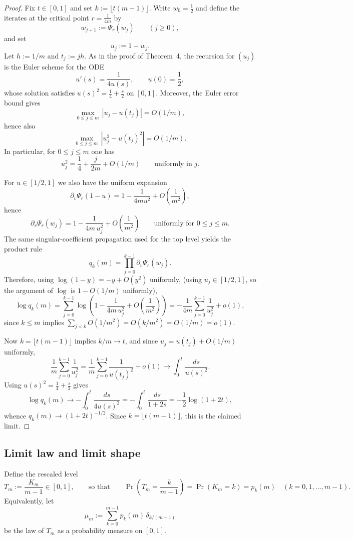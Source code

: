 \documentclass[11pt]{article}
\begin{document}
\begin{proof}
Fix $t\in[0,1]$ and set $k:=\lfloor t(m-1)\rfloor$.  Write $w_0=\frac12$ and define the
iterates at the critical point $r=\frac1{4m}$ by
\[
w_{j+1}:=\Psi_r(w_j)\qquad (j\ge0),
\]
and set
\[
u_j:=1-w_j.
\]
Let $h:=1/m$ and $t_j:=jh$.  As in the proof of Theorem~4, the recursion for $(u_j)$ is the
Euler scheme for the ODE
\[
u'(s)=\frac{1}{4u(s)},\qquad u(0)=\frac12,
\]
whose solution satisfies $u(s)^2=\frac14+\frac{s}{2}$ on $[0,1]$.  Moreover, the Euler error
bound gives
\[
\max_{0\le j\le m}\,|u_j-u(t_j)|=O(1/m),
\]
hence also
\[
\max_{0\le j\le m}\,|u_j^2-u(t_j)^2|=O(1/m).
\]
In particular, for $0\le j\le m$ one has
\[
u_j^2=\frac14+\frac{j}{2m}+O(1/m)
\qquad\text{uniformly in }j.
\]

For $u\in[1/2,1]$ we also have the uniform expansion
\[
\partial_v\Psi_r(1-u)=1-\frac{1}{4mu^2}+O\!\left(\frac1{m^2}\right),
\]
hence
\[
\partial_v\Psi_r(w_j)
=1-\frac{1}{4m\,u_j^2}+O\!\left(\frac1{m^2}\right)
\qquad\text{uniformly for }0\le j\le m.
\]
The same singular-coefficient propagation used for the top level yields the product rule
\[
q_k(m)=\prod_{j=0}^{k-1}\partial_v\Psi_r(w_j).
\]
Therefore, using $\log(1-y)=-y+O(y^2)$ uniformly, 
(using $u_j\in[1/2,1]$, so the argument of $\log$ is $1-O(1/m)$ uniformly),
\[
\log q_k(m)
=\sum_{j=0}^{k-1}\log\!\left(1-\frac{1}{4m\,u_j^2}+O\!\left(\frac1{m^2}\right)\right)
=-\frac{1}{4m}\sum_{j=0}^{k-1}\frac{1}{u_j^2}+o(1),
\]
since $k\le m$ implies $\sum_{j<k}O(1/m^2)=O(k/m^2)=O(1/m)=o(1)$.

Now $k=\lfloor t(m-1)\rfloor$ implies $k/m\to t$, and since $u_j=u(t_j)+O(1/m)$ uniformly,
\[
\frac1m\sum_{j=0}^{k-1}\frac{1}{u_j^2}
=\frac1m\sum_{j=0}^{k-1}\frac{1}{u(t_j)^2}+o(1)
\longrightarrow \int_0^t \frac{ds}{u(s)^2}.
\]
Using $u(s)^2=\frac14+\frac{s}{2}$ gives
\[
\log q_k(m)\longrightarrow
-\int_0^t \frac{ds}{4u(s)^2}
=-\int_0^t \frac{ds}{1+2s}
=-\frac12\log(1+2t),
\]
whence $q_k(m)\to (1+2t)^{-1/2}$.  Since $k=\lfloor t(m-1)\rfloor$, this is the claimed limit.
\end{proof}


\subsection{Limit law and limit shape}
Define the rescaled level
\[
T_m := \frac{K_m}{m-1}\in[0,1],
\qquad\text{so that}\qquad
\Pr\!\left(T_m=\frac{k}{m-1}\right)=\Pr(K_m=k)=p_k(m)
\quad (k=0,1,\dots,m-1).
\]
Equivalently, let
\[
\mu_m := \sum_{k=0}^{m-1} p_k(m)\,\delta_{k/(m-1)}
\]
be the law of $T_m$ as a probability measure on $[0,1]$.
\end{document}
